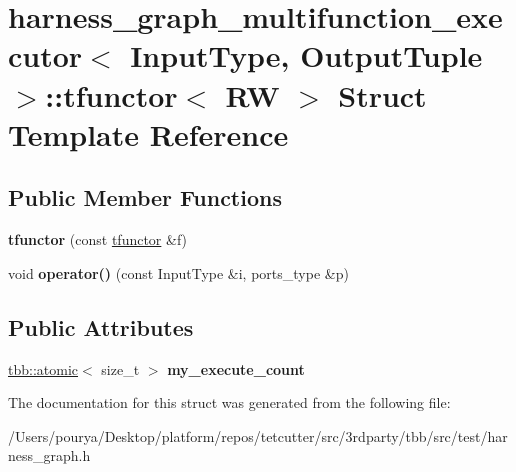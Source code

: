 \hypertarget{structharness__graph__multifunction__executor_1_1tfunctor}{}\section{harness\+\_\+graph\+\_\+multifunction\+\_\+executor$<$ Input\+Type, Output\+Tuple $>$\+:\+:tfunctor$<$ R\+W $>$ Struct Template Reference}
\label{structharness__graph__multifunction__executor_1_1tfunctor}
\subsection*{Public Member Functions}
\begin{DoxyCompactItemize}
\item 
\hypertarget{structharness__graph__multifunction__executor_1_1tfunctor_abb87d7ac71a9cc2b415211b393b81686}{}{\bfseries tfunctor} (const \hyperlink{structharness__graph__multifunction__executor_1_1tfunctor}{tfunctor} \&f)\label{structharness__graph__multifunction__executor_1_1tfunctor_abb87d7ac71a9cc2b415211b393b81686}

\item 
\hypertarget{structharness__graph__multifunction__executor_1_1tfunctor_a07dddb15e8a5d7771440406d434f9269}{}void {\bfseries operator()} (const Input\+Type \&i, ports\+\_\+type \&p)\label{structharness__graph__multifunction__executor_1_1tfunctor_a07dddb15e8a5d7771440406d434f9269}

\end{DoxyCompactItemize}
\subsection*{Public Attributes}
\begin{DoxyCompactItemize}
\item 
\hypertarget{structharness__graph__multifunction__executor_1_1tfunctor_a782e9a8550d0e7fa8d48e90ccfdcc758}{}\hyperlink{structtbb_1_1atomic}{tbb\+::atomic}$<$ size\+\_\+t $>$ {\bfseries my\+\_\+execute\+\_\+count}\label{structharness__graph__multifunction__executor_1_1tfunctor_a782e9a8550d0e7fa8d48e90ccfdcc758}

\end{DoxyCompactItemize}


The documentation for this struct was generated from the following file\+:\begin{DoxyCompactItemize}
\item 
/\+Users/pourya/\+Desktop/platform/repos/tetcutter/src/3rdparty/tbb/src/test/harness\+\_\+graph.\+h\end{DoxyCompactItemize}
